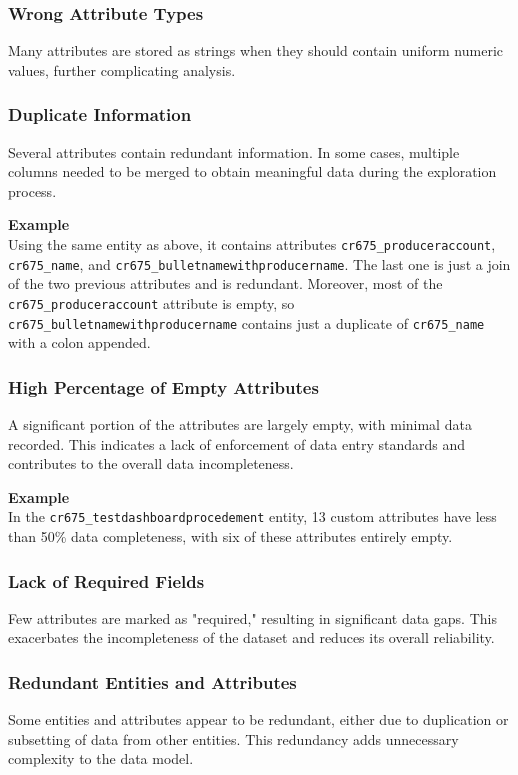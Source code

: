 \subsubsection{Wrong Attribute Types}
Many attributes are stored as strings when they should contain uniform numeric values, further complicating analysis.

\newpage

\subsubsection{Duplicate Information}
Several attributes contain redundant information. In some cases, multiple columns needed to be merged to obtain meaningful data during the exploration process.

\textbf{Example}\\
Using the same entity as above, it contains attributes \texttt{cr675\_produceraccount}, \texttt{cr675\_name}, and \texttt{cr675\_bulletnamewithproducername}. The last one is just a join of the two previous attributes and is redundant. Moreover, most of the \texttt{cr675\_produceraccount} attribute is empty, so \texttt{cr675\_bulletnamewithproducername} contains just a duplicate of \texttt{cr675\_name} with a colon appended.

\subsubsection{High Percentage of Empty Attributes}
A significant portion of the attributes are largely empty, with minimal data recorded. This indicates a lack of enforcement of data entry standards and contributes to the overall data incompleteness.

\textbf{Example}\\
In the \texttt{cr675\_testdashboardprocedement} entity, 13 custom attributes have less than 50\% data completeness, with six of these attributes entirely empty.

\subsubsection{Lack of Required Fields}
Few attributes are marked as "required," resulting in significant data gaps. This exacerbates the incompleteness of the dataset and reduces its overall reliability.

\subsubsection{Redundant Entities and Attributes}
Some entities and attributes appear to be redundant, either due to duplication or subsetting of data from other entities. This redundancy adds unnecessary complexity to the data model.

